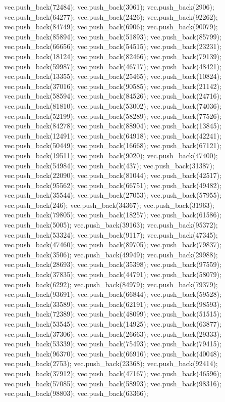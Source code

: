 vec.push_back(72484);
vec.push_back(3061);
vec.push_back(2906);
vec.push_back(64277);
vec.push_back(2426);
vec.push_back(92262);
vec.push_back(84749);
vec.push_back(6906);
vec.push_back(90079);
vec.push_back(85894);
vec.push_back(51893);
vec.push_back(85799);
vec.push_back(66656);
vec.push_back(54515);
vec.push_back(23231);
vec.push_back(18124);
vec.push_back(82466);
vec.push_back(79139);
vec.push_back(59987);
vec.push_back(46717);
vec.push_back(48421);
vec.push_back(13355);
vec.push_back(25465);
vec.push_back(10824);
vec.push_back(37016);
vec.push_back(90585);
vec.push_back(21142);
vec.push_back(58594);
vec.push_back(84526);
vec.push_back(24716);
vec.push_back(81810);
vec.push_back(53002);
vec.push_back(74036);
vec.push_back(52199);
vec.push_back(58289);
vec.push_back(77526);
vec.push_back(84278);
vec.push_back(88904);
vec.push_back(13845);
vec.push_back(12491);
vec.push_back(64918);
vec.push_back(42241);
vec.push_back(50449);
vec.push_back(16668);
vec.push_back(67121);
vec.push_back(19511);
vec.push_back(9020);
vec.push_back(47400);
vec.push_back(54984);
vec.push_back(437);
vec.push_back(31387);
vec.push_back(22090);
vec.push_back(81044);
vec.push_back(42517);
vec.push_back(95562);
vec.push_back(66751);
vec.push_back(49482);
vec.push_back(35544);
vec.push_back(27053);
vec.push_back(57955);
vec.push_back(246);
vec.push_back(34367);
vec.push_back(31963);
vec.push_back(79805);
vec.push_back(18257);
vec.push_back(61586);
vec.push_back(5005);
vec.push_back(39163);
vec.push_back(95372);
vec.push_back(53324);
vec.push_back(9117);
vec.push_back(47345);
vec.push_back(47460);
vec.push_back(89705);
vec.push_back(79837);
vec.push_back(3506);
vec.push_back(49949);
vec.push_back(29988);
vec.push_back(28693);
vec.push_back(35398);
vec.push_back(97559);
vec.push_back(37835);
vec.push_back(44791);
vec.push_back(58079);
vec.push_back(6292);
vec.push_back(84979);
vec.push_back(79379);
vec.push_back(93691);
vec.push_back(66844);
vec.push_back(59528);
vec.push_back(33589);
vec.push_back(62191);
vec.push_back(98593);
vec.push_back(72389);
vec.push_back(48099);
vec.push_back(51515);
vec.push_back(53545);
vec.push_back(14925);
vec.push_back(63877);
vec.push_back(37306);
vec.push_back(26663);
vec.push_back(29333);
vec.push_back(53339);
vec.push_back(75493);
vec.push_back(79415);
vec.push_back(96370);
vec.push_back(66916);
vec.push_back(40048);
vec.push_back(2753);
vec.push_back(23368);
vec.push_back(92414);
vec.push_back(37912);
vec.push_back(47167);
vec.push_back(46596);
vec.push_back(57085);
vec.push_back(58993);
vec.push_back(98316);
vec.push_back(98803);
vec.push_back(63366);
